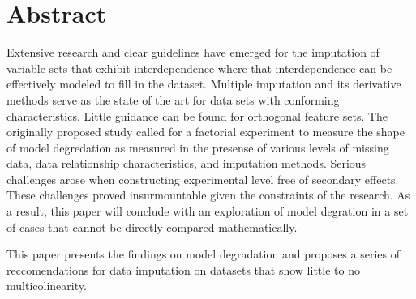 \documentclass[../paper.tex]{subfiles}
\begin{document}
\section{Abstract}

Extensive research and clear guidelines have emerged for the imputation
of variable sets that exhibit interdependence where that interdependence can be effectively modeled to fill in the dataset.
Multiple imputation and its derivative methods serve as the state of the art for
data sets with conforming characteristics. Little guidance can be found
for orthogonal feature sets. The originally proposed study called for a factorial experiment
to measure the shape of model degredation as measured in the presense of various levels of missing data, data relationship characteristics, and imputation methods.
Serious challenges arose when constructing experimental level free of secondary effects.
These challenges proved insurmountable given the constraints of the research.
As a result, this paper will conclude with an exploration of model degration in a set of cases that cannot be directly compared mathematically.

This paper presents the findings on model degradation and proposes a series of
reccomendations for data imputation on datasets that show little to no multicolinearity.

\end{document}
